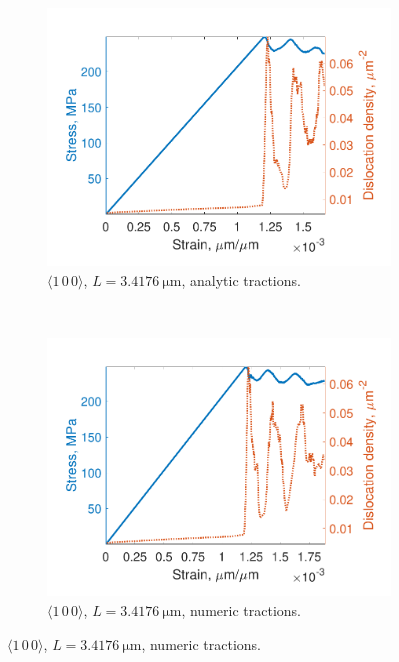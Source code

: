 \begin{figure}
    \centering
    \begin{subfigure}[t]{0.45\linewidth}
        \centering
        \includegraphics[width=\linewidth]{../data/density_11-Mar-2021_8_tensile_ni_100.pdf}
        \caption{$\langle 1\, 0\, 0 \rangle$, $L = \SI{3.4176}{\micro\metre}$, analytic tractions.}
        \label{sf:stressDens1}
    \end{subfigure}
    ~
    \begin{subfigure}[t]{0.45\linewidth}
        \centering
        \includegraphics[width=\linewidth]{../data/density_11-Mar-2021_numT_8_tensile_ni_100.pdf}
        \caption{$\langle 1\, 0\, 0 \rangle$, $L = \SI{3.4176}{\micro\metre}$, numeric tractions.}
        \label{sf:stressDens2}
    \end{subfigure}


\end{figure}
